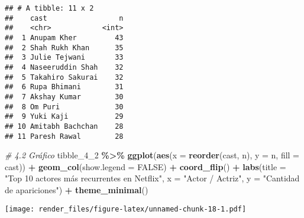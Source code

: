 \documentclass[
]{article}
\newenvironment{Shaded}{\begin{snugshade}}{\end{snugshade}}
\newcommand{\AttributeTok}[1]{\textcolor[rgb]{0.13,0.29,0.53}{#1}}
\newcommand{\CommentTok}[1]{\textcolor[rgb]{0.56,0.35,0.01}{\textit{#1}}}
\newcommand{\ConstantTok}[1]{\textcolor[rgb]{0.56,0.35,0.01}{#1}}
\newcommand{\FunctionTok}[1]{\textcolor[rgb]{0.13,0.29,0.53}{\textbf{#1}}}
\newcommand{\NormalTok}[1]{#1}
\newcommand{\SpecialCharTok}[1]{\textcolor[rgb]{0.81,0.36,0.00}{\textbf{#1}}}
\newcommand{\StringTok}[1]{\textcolor[rgb]{0.31,0.60,0.02}{#1}}
\begin{document}
\begin{verbatim}
## # A tibble: 11 x 2
##    cast                 n
##    <chr>            <int>
##  1 Anupam Kher         43
##  2 Shah Rukh Khan      35
##  3 Julie Tejwani       33
##  4 Naseeruddin Shah    32
##  5 Takahiro Sakurai    32
##  6 Rupa Bhimani        31
##  7 Akshay Kumar        30
##  8 Om Puri             30
##  9 Yuki Kaji           29
## 10 Amitabh Bachchan    28
## 11 Paresh Rawal        28
\end{verbatim}

\begin{Shaded}
\begin{Highlighting}[]
\CommentTok{\# 4.2 Gráfico}
\NormalTok{tibble\_4\_2 }\SpecialCharTok{\%\textgreater{}\%}
  \FunctionTok{ggplot}\NormalTok{(}\FunctionTok{aes}\NormalTok{(}\AttributeTok{x =} \FunctionTok{reorder}\NormalTok{(cast, n), }\AttributeTok{y =}\NormalTok{ n, }\AttributeTok{fill =}\NormalTok{ cast)) }\SpecialCharTok{+}
  \FunctionTok{geom\_col}\NormalTok{(}\AttributeTok{show.legend =} \ConstantTok{FALSE}\NormalTok{) }\SpecialCharTok{+}
  \FunctionTok{coord\_flip}\NormalTok{() }\SpecialCharTok{+}
  \FunctionTok{labs}\NormalTok{(}\AttributeTok{title =} \StringTok{"Top 10 actores más recurrentes en Netflix"}\NormalTok{,}
       \AttributeTok{x =} \StringTok{"Actor / Actriz"}\NormalTok{, }\AttributeTok{y =} \StringTok{"Cantidad de apariciones"}\NormalTok{) }\SpecialCharTok{+}
  \FunctionTok{theme\_minimal}\NormalTok{()}
\end{Highlighting}
\end{Shaded}

\texttt{[image: render\_files/figure-latex/unnamed-chunk-18-1.pdf]}
\end{document}
